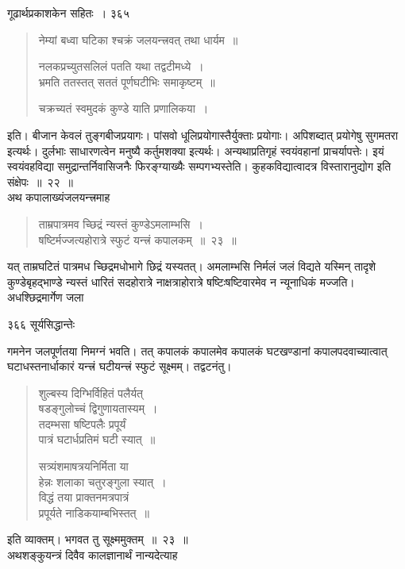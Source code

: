 \documentclass[11pt, openany]{book}
\begin{document}
\newpage


\hspace{3cm} गूढार्थप्रकाशकेन सहितः~।  \hfill ३६५
\vspace{1cm}


 \begin{quote}
 {\qt नेम्यां बध्वा घटिका
श्चक्रं जलयन्त्त्रवत् तथा धार्यम~॥

नलकप्रच्युतसलिलं
पतति यथा तद्वटीमध्ये~।\\
भ्रमति ततस्तत् सततं
पूर्णघटीभिः समाकृष्टम्~॥

चक्रच्यतं स्वमुदकं
कुण्डे याति प्रणालिकया~। }
\end{quote}
इति। बीजान केवलं तुङ्गबीजप्रयागः। पांसवो धूलिप्रयोगास्तैर्युक्ताः प्रयोगाः। अपिशब्दात् प्रयोगेषु सुगमतरा इत्यर्थः। दुर्लभाः साधारणत्वेन मनुष्यै कर्तुमशक्या इत्यर्थः। अन्यथाप्रतिगृहं स्वयंवहानां प्राचर्यापत्तेः। इयं स्वयंवहविद्या समुद्रान्तर्निवासिजनैः फिरङ्ग्याख्यैः सम्पगभ्यस्तेति। कुहकविद्यात्वादत्र विस्तारानुद्योग इति संक्षेपः~॥~२२~॥\\
अथ कपालाख्यंजलयन्त्त्रमाह \textendash


 \begin{quote}
{\ssi ताम्रपात्रमव च्छिद्रं न्यस्तं कुण्डेऽमलाम्भसि~। \\
षष्टिर्मज्जत्यहोरात्रे स्फुटं यन्त्त्रं कपालकम्~॥~२३~॥}
\end{quote}
 यत् ताम्रघटितं पात्रमध च्छिद्रमधोभागे छिद्रं यस्यतत्। अमलाम्भसि निर्मलं जलं विद्यते यस्मिन् तादृशे कुण्डेबृहद्भाण्डे न्यस्तं धारितं सदहोरात्रे नाक्षत्राहोरात्रे षष्टिःषष्टिवारमेव न न्यूनाधिकं मज्जति। अधश्छिद्रमार्गेण जला \textendash



\newpage


\noindent ३६६ \hspace{4cm} सूर्यसिद्धान्तेः 
\vspace{1cm}


\noindent गमनेन जलपूर्णतया निमग्नं भवति। तत् कपालकं कपालमेव कपालकं घटखण्डानां कपालपदवाच्यात्वात् घटाधस्तनार्धाकारं यन्त्त्रं घटीयन्त्त्रं स्फुटं सूक्ष्मम्। तद्वटनंतु। 


 \begin{quote}
{\qt  शुल्बस्य दिग्भिर्विहितं पलैर्यत्  \\
षडङ्गुलोच्चं द्विगुणायतास्यम्~।\\
तदम्भसा षष्टिपलैः प्रपूर्यं \\
पात्रं घटार्धप्रतिमं घटी स्यात्~॥

सत्र्यंशमाषत्रयनिर्मिता या \\
हेन्नः शलाका चतुरङ्गुला स्यात्~।\\
विद्धं तया प्राक्तनमत्रपात्रं \\
प्रपूर्यते नाडिकयाम्बभिस्तत्~॥ }
\end{quote}
इति व्याक्तम्। भगवत तु सूक्ष्ममुक्तम्~॥~२३~॥\\
अथशङ्कुयन्त्रं दिवैव कालज्ञानार्थं नान्यदेत्याह \textendash
\end{document}
